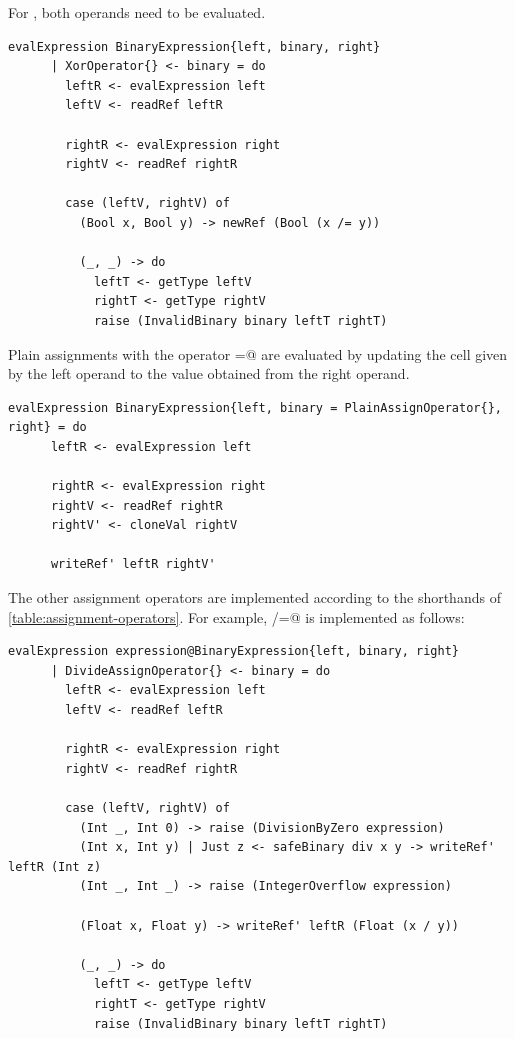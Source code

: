 \documentclass[UdineBachThesis,american,11pt]{PhdThesis}
\begin{document}
  \newpage

  For \lstinline@xor@, both operands need to be evaluated.

  \begin{lstlisting}[gobble=4,basicstyle=\ttfamily\small]
    evalExpression BinaryExpression{left, binary, right}
      | XorOperator{} <- binary = do
        leftR <- evalExpression left
        leftV <- readRef leftR

        rightR <- evalExpression right
        rightV <- readRef rightR

        case (leftV, rightV) of
          (Bool x, Bool y) -> newRef (Bool (x /= y))

          (_, _) -> do
            leftT <- getType leftV
            rightT <- getType rightV
            raise (InvalidBinary binary leftT rightT)
  \end{lstlisting}

  Plain assignments with the operator \lstinline@=@ are evaluated by updating
  the cell given by the left operand to the value obtained from the right
  operand.

  \begin{lstlisting}[gobble=4,basicstyle=\ttfamily\small]
    evalExpression BinaryExpression{left, binary = PlainAssignOperator{}, right} = do
      leftR <- evalExpression left

      rightR <- evalExpression right
      rightV <- readRef rightR
      rightV' <- cloneVal rightV

      writeRef' leftR rightV'
  \end{lstlisting}

  The other assignment operators are implemented according to the shorthands of
  \autoref{table:assignment-operators}. For example, \lstinline@/=@ is
  implemented as follows:

  \begin{lstlisting}[gobble=4,basicstyle=\ttfamily\small]
    evalExpression expression@BinaryExpression{left, binary, right}
      | DivideAssignOperator{} <- binary = do
        leftR <- evalExpression left
        leftV <- readRef leftR

        rightR <- evalExpression right
        rightV <- readRef rightR

        case (leftV, rightV) of
          (Int _, Int 0) -> raise (DivisionByZero expression)
          (Int x, Int y) | Just z <- safeBinary div x y -> writeRef' leftR (Int z)
          (Int _, Int _) -> raise (IntegerOverflow expression)

          (Float x, Float y) -> writeRef' leftR (Float (x / y))

          (_, _) -> do
            leftT <- getType leftV
            rightT <- getType rightV
            raise (InvalidBinary binary leftT rightT)
  \end{lstlisting}
\end{document}
